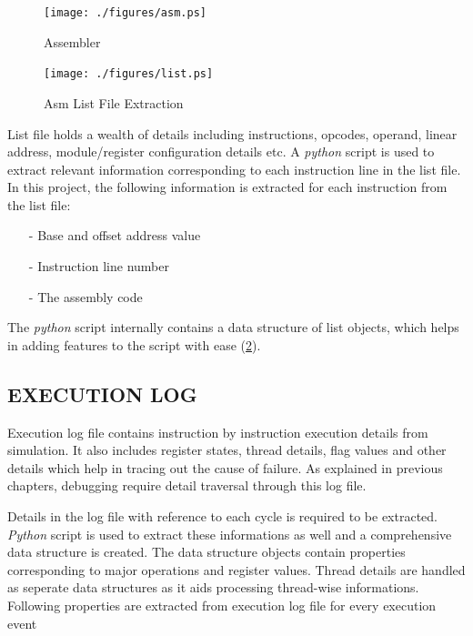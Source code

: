 
\begin{figure}[h]
\centering
\texttt{[image: ./figures/asm.ps]}
\caption{Assembler}
\label{impl.tex:assembler}
\end{figure}


\begin{figure}[h]
\centering
\texttt{[image: ./figures/list.ps]}
\caption{Asm List File Extraction}
\label{impl.tex:listextr}
\end{figure}

List file holds a wealth of details including instructions, opcodes, operand, linear address, module/register configuration details etc. A {\it python} script is used to extract relevant information corresponding to each instruction line in the list file. In this project, the following information is extracted for each instruction from the  list file:
\begin{itemize}
	\item[-] Base and offset address value
	\item[-] Instruction line number
	\item[-] The assembly code
\end{itemize}

The {\it python} script internally contains a data structure of list objects, which helps in adding features to the script with ease (\figurename{\ref{impl.tex:listextr}}). 

\subsection {EXECUTION LOG}
Execution log file contains instruction by instruction execution details from simulation. It also includes register states, thread details, flag values and other details which help in tracing out the cause of failure. As explained in previous chapters, debugging require detail traversal through this log file. 

Details in the log file with reference to each cycle is required to be extracted. {\it Python} script is used to extract these informations as well and a comprehensive data structure is created. The data structure objects contain properties corresponding to major operations and register values. Thread details are handled as seperate data structures as it aids processing thread-wise informations. Following properties are extracted from execution log file for every execution event

